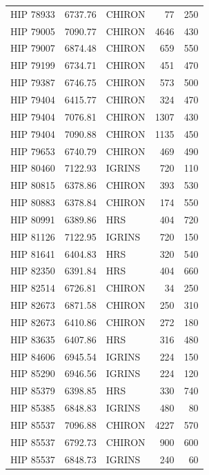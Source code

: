 {\begin{scriptsize}
\begin{longtable}{|l|rlrr|}
   HIP 78933 &  6737.76 &     CHIRON &       77 &   250 \\
   HIP 79005 &  7090.77 &     CHIRON &     4646 &   430 \\
   HIP 79007 &  6874.48 &     CHIRON &      659 &   550 \\
   HIP 79199 &  6734.71 &     CHIRON &      451 &   470 \\
   HIP 79387 &  6746.75 &     CHIRON &      573 &   500 \\
   HIP 79404 &  6415.77 &     CHIRON &      324 &   470 \\
   HIP 79404 &  7076.81 &     CHIRON &     1307 &   430 \\
   HIP 79404 &  7090.88 &     CHIRON &     1135 &   450 \\
   HIP 79653 &  6740.79 &     CHIRON &      469 &   490 \\
   HIP 80460 &  7122.93 &     IGRINS &      720 &   110 \\
   HIP 80815 &  6378.86 &     CHIRON &      393 &   530 \\
   HIP 80883 &  6378.84 &     CHIRON &      174 &   550 \\
   HIP 80991 &  6389.86 &        HRS &      404 &   720 \\
   HIP 81126 &  7122.95 &     IGRINS &      720 &   150 \\
   HIP 81641 &  6404.83 &        HRS &      320 &   540 \\
   HIP 82350 &  6391.84 &        HRS &      404 &   660 \\
   HIP 82514 &  6726.81 &     CHIRON &       34 &   250 \\
   HIP 82673 &  6871.58 &     CHIRON &      250 &   310 \\
   HIP 82673 &  6410.86 &     CHIRON &      272 &   180 \\
   HIP 83635 &  6407.86 &        HRS &      316 &   480 \\
   HIP 84606 &  6945.54 &     IGRINS &      224 &   150 \\
   HIP 85290 &  6946.56 &     IGRINS &      224 &   120 \\
   HIP 85379 &  6398.85 &        HRS &      330 &   740 \\
   HIP 85385 &  6848.83 &     IGRINS &      480 &    80 \\
   HIP 85537 &  7096.88 &     CHIRON &     4227 &   570 \\
   HIP 85537 &  6792.73 &     CHIRON &      900 &   600 \\
   HIP 85537 &  6848.73 &     IGRINS &      240 &    60 \\

\end{longtable}
\end{scriptsize}}
